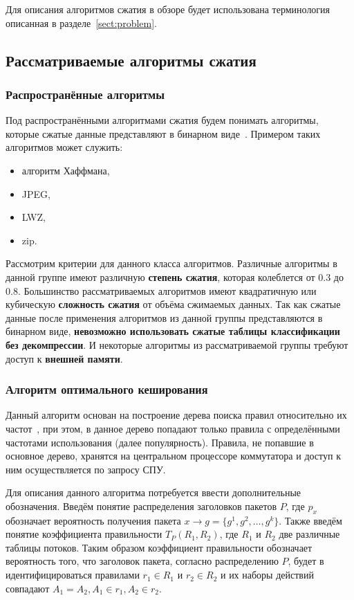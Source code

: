 \documentclass[oneside,final,12pt]{extarticle}
\begin{document}
        Для описания алгоритмов сжатия в обзоре будет использована терминология описанная в разделе~\ref{sect:problem}. 

    \subsection{Рассматриваемые алгоритмы сжатия}
        \subsubsection{Распространённые алгоритмы}
            Под распространёнными алгоритмами сжатия будем понимать алгоритмы, 
            которые сжатые данные представляют в бинарном виде~\cite{kodituwakku2010comparison}. 
            Примером таких алгоритмов может служить:
            \begin{itemize}
                \item алгоритм Хаффмана,
                \item JPEG,
                \item LWZ,
                \item zip.
            \end{itemize}
            
            Рассмотрим критерии для данного класса алгоритмов. Различные алгоритмы в данной группе имеют различную \textbf{степень сжатия}, 
            которая колеблется от 0.3 до 0.8. Большинство рассматриваемых алгоритмов имеют квадратичную или кубическую \textbf{сложность сжатия} 
            от объёма сжимаемых данных. Так как сжатые данные после применения алгоритмов из данной группы представляются в бинарном виде,
            \textbf{невозможно использовать сжатые таблицы классификации без декомпрессии}. И некоторые алгоритмы из рассматриваемой группы требуют доступ к \textbf{внешней памяти}.
        \subsubsection{Алгоритм оптимального кеширования}
            Данный алгоритм основан на построение дерева поиска правил относительно их частот~\cite{rottenstreich2016optimal}, при этом, в данное дерево
            попадают только правила с определёнными частотами использования (далее популярность). 
            Правила, не попавшие в основное дерево, хранятся на центральном процессоре коммутатора и  доступ к ним осуществляется по запросу СПУ.
            
            Для описания данного алгоритма потребуется ввести дополнительные обозначения. Введём понятие распределения заголовков пакетов \(P\),
            где \(p_x\) обозначает вероятность получения пакета \(x \rightarrow g=\{g^1,g^2,\ldots,g^k\}\).
            Также введём понятие коэффициента правильности \(T_P(R_1, R_2)\), где \(R_1\) и \(R_2\) две различные таблицы потоков. 
            Таким образом коэффициент правильности обозначает вероятность того, что заголовок пакета, согласно распределению \(P\),
            будет в идентифицироваться правилами \(r_1 \in R_1\) и \(r_2 \in R_2\) и их наборы действий совпадают \(A_1 = A_2, A_1 \in r_1, A_2 \in r_2\).
            
\end{document}
